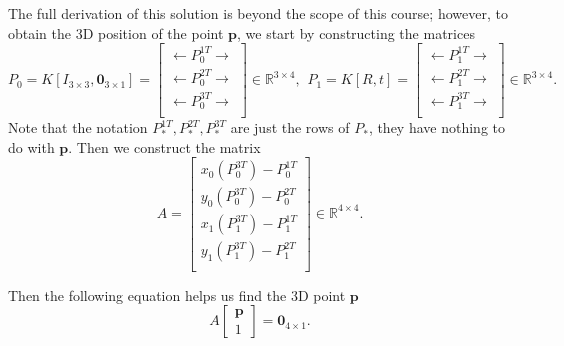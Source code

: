 \begin{enumerate}
    The full derivation of this solution is beyond the scope of this course; however, to obtain the 3D position of the point $\mathbf{p}$, we start by constructing the matrices
    \begin{equation}
        P_0 = K[I_{3\times 3},\mathbf{0}_{3 \times 1}] =
        \begin{bmatrix}
           \leftarrow P_{0}^{1T} \rightarrow \\
           \leftarrow P_{0}^{2T} \rightarrow \\
           \leftarrow P_{0}^{3T} \rightarrow \\
        \end{bmatrix}
        \in \mathbb{R}^{3 \times 4}, \hspace{5pt}
        P_1 = K[R,t] =
        \begin{bmatrix}
           \leftarrow P_{1}^{1T} \rightarrow \\
           \leftarrow P_{1}^{2T} \rightarrow \\
           \leftarrow P_{1}^{3T} \rightarrow \\
        \end{bmatrix}
        \in \mathbb{R}^{3 \times 4}.
    \end{equation}
    Note that the notation $P_{*}^{1T}, P_{*}^{2T}, P_{*}^{3T}$ are just the rows of $P_{*}$, they have nothing to do with  $\mathbf{p}$.
    \newline
    \newline
    Then we construct the matrix 
    \begin{equation}
        A = 
        \begin{bmatrix}
        x_0(P_{0}^{3T}) - P_{0}^{1T} \\
        y_0(P_{0}^{3T}) - P_{0}^{2T} \\
        x_1(P_{1}^{3T}) - P_{1}^{1T} \\
        y_1(P_{1}^{3T}) - P_{1}^{2T} \\
        \end{bmatrix}
        \in \mathbb{R}^{4 \times 4}.
    \end{equation}
    
    Then the following equation helps us find the 3D point $\mathbf{p}$
    \begin{equation}
        A
        \begin{bmatrix}
        \mathbf{p} \\
        1
        \end{bmatrix}
        = \mathbf{0}_{4 \times 1}.
    \end{equation}
    

\end{enumerate}
